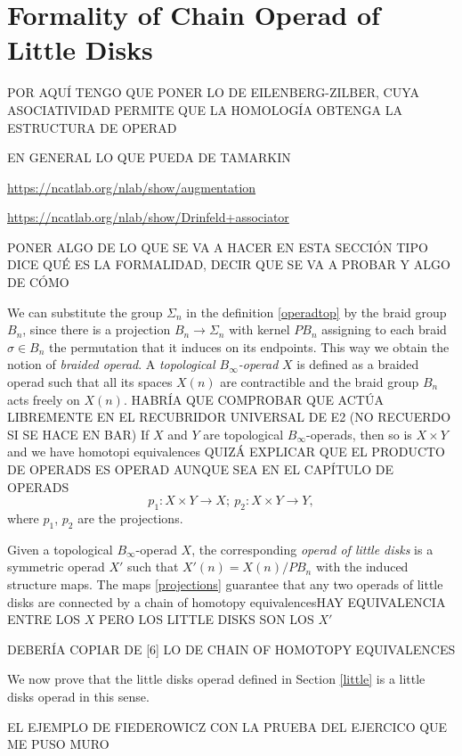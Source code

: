 \documentclass[TFM.tex]{subfiles}
\begin{document}
\chapter{Formality of Chain Operad of Little Disks}
POR AQUÍ TENGO QUE PONER LO DE EILENBERG-ZILBER, CUYA ASOCIATIVIDAD PERMITE QUE LA HOMOLOGÍA OBTENGA LA ESTRUCTURA DE OPERAD


EN GENERAL LO QUE PUEDA DE TAMARKIN


\url{https://ncatlab.org/nlab/show/augmentation}

\url{https://ncatlab.org/nlab/show/Drinfeld+associator}


PONER ALGO DE LO QUE SE VA A HACER EN ESTA SECCIÓN TIPO DICE QUÉ ES LA FORMALIDAD, DECIR QUE SE VA A PROBAR Y ALGO DE CÓMO

We can substitute the group $\Sigma_n$ in the definition \ref{operadtop} by the braid group $B_n$, since there is a projection $B_n\to \Sigma_n$ with kernel $PB_n$ assigning to each braid $\sigma\in B_n$ the permutation that it induces on its endpoints. This way we obtain the notion of \emph{braided operad}. A \emph{topological $B_\infty$-operad} $X$ is defined as a braided operad such that all its spaces $X(n)$ are contractible and the braid group $B_n$ acts freely on $X(n)$. HABRÍA QUE COMPROBAR QUE ACTÚA LIBREMENTE EN EL RECUBRIDOR UNIVERSAL DE E2 (NO RECUERDO SI SE HACE EN BAR) If $X$ and $Y$ are topological $B_\infty$-operads, then so is $X\times Y$ and we have homotopi equivalences QUIZÁ EXPLICAR QUE EL PRODUCTO DE OPERADS ES OPERAD AUNQUE SEA EN EL CAPÍTULO DE OPERADS
\begin{equation}\label{projections}
p_1:X\times Y\to X;\ p_2:X\times Y\to Y,
\end{equation}
where $p_1$, $p_2$ are the projections. 

Given a topological $B_\infty$-operad $X$, the corresponding \emph{operad of little disks} is a symmetric operad $X'$ such that $X'(n)=X(n)/PB_n$ with the induced structure maps. The maps \ref{projections} guarantee that any two operads of little disks are connected by a chain of homotopy equivalencesHAY EQUIVALENCIA ENTRE LOS $X$ PERO LOS LITTLE DISKS SON LOS $X'$

 DEBERÍA COPIAR DE [6] LO DE CHAIN OF HOMOTOPY EQUIVALENCES


We now prove that the little disks operad defined in Section \ref{little} is a little disks operad in this sense.

EL EJEMPLO DE FIEDEROWICZ CON LA PRUEBA DEL EJERCICO QUE ME PUSO MURO
\end{document}
